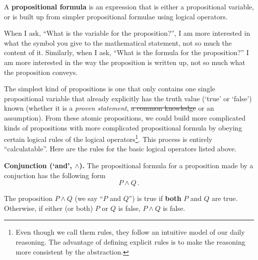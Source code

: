 \begin{definition}
    A {\bf propositional formula} is an expression that is either a propositional 
    variable, or is built up from simpler propositional formulae using logical
    operators.
\end{definition}
\begin{remark}
    When I ask, ``What is the variable for the proposition?'', I am more
    interested in what the symbol you give to the mathematical statement, not
    so much the content of it.
    Similarly, when I ask, ``What is the formula for the proposition?''
    I am more interested in the way the proposition is written up, not so much
    what the proposition conveys.
\end{remark}
    
The simplest kind of propositions is one that only contains one single 
propositional variable that already explicitly has the truth value  (`true' or `false')
known (whether it is a \emph{proven statement}, \sout{a common knowledge} or an assumption).
From these atomic propositions, we could build more complicated kinds of propositions
with more complicated propositional formula
by obeying certain logical rules of the logical operators\footnote{Even though we call them rules, they follow an
    intuitive model of our daily reasoning. 
    The advantage of defining explicit rules is to make the 
    reasoning more consistent by the abstraction.}.
    This process is  entirely ``calculatable''.
Here are the rules for the basic logical operators listed above.

{\bf Conjunction (`and', $\wedge$).}
 The propositional formula for a proposition made by a conjuction has the following form
\begin{equation*}
    P \wedge Q \,.
\end{equation*}
\begin{rule*}
The proposition $P \wedge Q$ (we say ``$P$ and $Q$'') is true if {\bf both} $P$ and $Q$ are true.
Otherwise, if either (or both) $P$ or $Q$ is false, $P \wedge Q$ is false.
\end{rule*}

